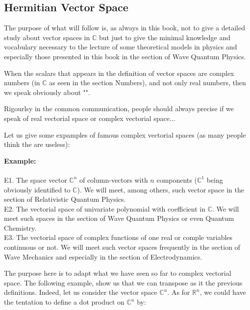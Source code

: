 	\pagebreak
	\subsection{Hermitian Vector Space}
	The purpose of what will follow is, as always in this book, not to give a detailed study about vector spaces in $\mathbb{C}$ but just to give the minimal knowledge and vocabulary necessary to the lecture of some theoretical models in physics and especially those presented in this book in the section of Wave Quantum Physics.
	
	When the scalars that appears in the definition of vector spaces are complex numbers (in $\mathbb{C}$ as seen in the section Numbers), and not only real numbers, then we speak obviously about "".
	
	\begin{tcolorbox}[title=Remark,colframe=black,arc=10pt]
	Rigourlsy in the common communication, people should always precise if we speak of real vectorial space or complex vectorial space...
	\end{tcolorbox}
	Let us give some expamples of famous complex vectorial spaces (as many people think the are useless):

	\begin{tcolorbox}[colframe=black,colback=white,sharp corners]
	\textbf{{\Large {}}Example:}\\\\
	E1. The space vector $\mathbb{C}^n$ of column-vectors with $n$ components ($\mathbb{C}^1$ being obviously identified to $\mathbb{C}$). We will meet, among others, such vector space in the section of Relativistic Quantum Physics.\\
	
	E2. The vectorial space of univariate polynomial with coefficient in $\mathbb{C}$. We will meet such spaces in the section of Wave Quantum Physics or even Quantum Chemistry.\\
	
	E3. The vectorial space of complex functions of one real or comple variables continuous or not. We will meet such vector spaces frequently in the section of Wave Mechanics and especially in the section of Electrodynamics.
	\end{tcolorbox}
	The purpose here is to adapt what we have seen so far to complex vectorial space. The following example, show us that we can transpose as it the previous definitions. Indeed, let us consider the vector space $\mathbb{C}^n$. As for $\mathbb{R}^n$, we could have the tentation to define a dot product on $\mathbb{C}^n$ by:
	
